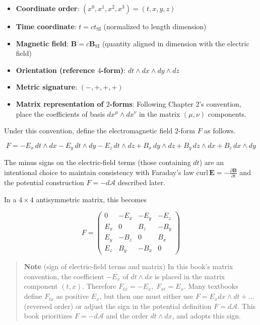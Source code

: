 \documentclass[a4paper,12pt,openany]{book}
\begin{document}
\begin{itemize}
\item
  \textbf{Coordinate order}: \((x^0, x^1, x^2, x^3) = (t, x, y, z)\)
\item
  \textbf{Time coordinate}: \(t = ct_{\text{SI}}\) (normalized to length
  dimension)
\item
  \textbf{Magnetic field}: \(\mathbf{B} = c\mathbf{B}_{\text{SI}}\)
  (quantity aligned in dimension with the electric field)
\item
  \textbf{Orientation (reference $4$-form)}:
  \(dt \wedge dx \wedge dy \wedge dz\)
\item
  \textbf{Metric signature}: \((-, +, +, +)\)
\item
  \textbf{Matrix representation of $2$-forms}: Following Chapter 2's
  convention, place the coefficients of basis \(dx^\mu \wedge dx^\nu\)
  in the matrix \((\mu, \nu)\) components.
\end{itemize}

Under this convention, define the electromagnetic field \(2\)-form \(F\)
as follows.

\[
F = -E_x\,dt\wedge dx - E_y\,dt\wedge dy - E_z\,dt\wedge dz + B_x\,dy\wedge dz + B_y\,dz\wedge dx + B_z\,dx\wedge dy
\]

The minus signs on the electric-field terms (those containing \(dt\))
are an intentional choice to maintain consistency with Faraday's law
\(\mathrm{curl}\,\mathbf{E} = -\frac{\partial\mathbf{B}}{\partial t}\)
and the potential construction \(F = -d\mathcal{A}\) described later.

In a \(4\times4\) antisymmetric matrix, this becomes

\[F = \begin{pmatrix}
0 & -E_x & -E_y & -E_z \\
E_x & 0 & B_z & -B_y \\
E_y & -B_z & 0 & B_x \\
E_z & B_y & -B_x & 0
\end{pmatrix}\]

\begin{quote}
\textbf{Note} (sign of electric-field terms and matrix) In this book's
matrix convention, the coefficient \(-E_x\) of \(dt \wedge dx\) is
placed in the matrix component \((t,x)\). Therefore
\(F_{tx}=-E_x,\;F_{xt}=E_x\). Many textbooks define \(F_{t x}\) as
positive \(E_x\), but then one must either use
\(F = E_x dx \wedge dt + \dots\) (reversed order) or adjust the sign in
the potential definition \(F=d\mathcal{A}\). This book prioritizes
\(F=-d\mathcal{A}\) and the order \(dt \wedge dx\), and adopts this
sign.
\end{quote}
\end{document}
